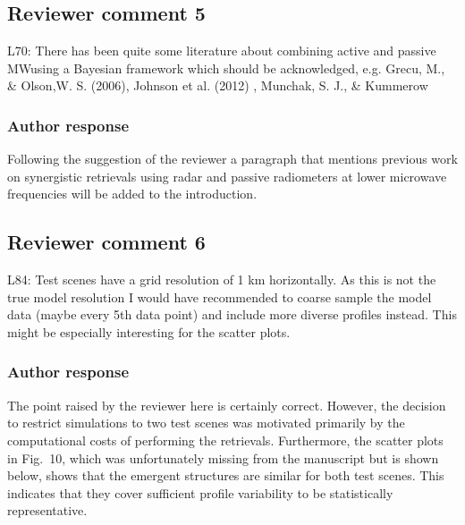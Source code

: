 \documentclass[11pt]{scrartcl}
\begin{document}
\subsection*{Reviewer comment 5}

L70: There has been quite some literature about combining active and passive
MWusing a Bayesian framework which should be acknowledged, e.g. Grecu, M., \&
Olson,W. S. (2006), Johnson et al. (2012) , Munchak, S. J., \& Kummerow

\subsubsection*{Author response}

Following the suggestion of the reviewer a paragraph that mentions previous work
on synergistic retrievals using radar and passive radiometers at lower microwave
frequencies will be added to the introduction.

%
%
%


\subsection*{Reviewer comment 6}

L84: Test scenes have a grid resolution of 1 km horizontally. As this is not the
true model resolution I would have recommended to coarse sample the model data
(maybe every 5th data point) and include more diverse profiles instead. This
might be especially interesting for the scatter plots.

\subsubsection*{Author response}

The point raised by the reviewer here is certainly correct. However, the
decision to restrict simulations to two test scenes was motivated primarily by
the computational costs of performing the retrievals. Furthermore, the scatter
plots in Fig.~10, which was unfortunately missing from the manuscript but is
shown below, shows that the emergent structures are similar for both test
scenes. This indicates that they cover sufficient profile variability to be
statistically representative.
\end{document}
